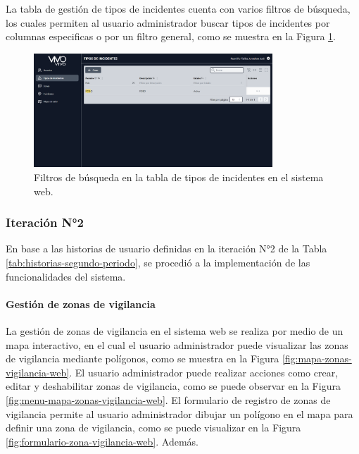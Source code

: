 La tabla de gestión de tipos de incidentes cuenta con varios filtros de búsqueda, los cuales permiten al usuario administrador buscar
tipos de incidentes por columnas especificas o por un filtro general, como se muestra en la Figura \ref{fig:filtros-tabla-tipos-incidentes-web}.

\begin{figure}[H]
    \centering
    \includegraphics[width=0.8\textwidth]{chapters/III-resultados-y-discusion/resources/images/filtros-tabla-tipos-incidentes-web.png}
    \caption{Filtros de búsqueda en la tabla de tipos de incidentes en el sistema web.}
    \label{fig:filtros-tabla-tipos-incidentes-web}
\end{figure}

\subsubsection{Iteración N°2}

En base a las historias de usuario definidas en la iteración N°2 de la Tabla \ref{tab:historias-segundo-periodo}, se procedió a la implementación
de las funcionalidades del sistema.

\paragraph{Gestión de zonas de vigilancia}

La gestión de zonas de vigilancia en el sistema web se realiza por medio de un mapa interactivo, en el cual el usuario administrador
puede visualizar las zonas de vigilancia mediante polígonos, como se muestra en la Figura \ref{fig:mapa-zonas-vigilancia-web}.
El usuario administrador puede realizar acciones como crear, editar y deshabilitar zonas de vigilancia, como se puede observar en la Figura
\ref{fig:menu-mapa-zonas-vigilancia-web}. El formulario de registro de zonas de vigilancia permite al usuario administrador dibujar
un polígono en el mapa para definir una zona de vigilancia, como se puede visualizar en la Figura \ref{fig:formulario-zona-vigilancia-web}.
Además.


